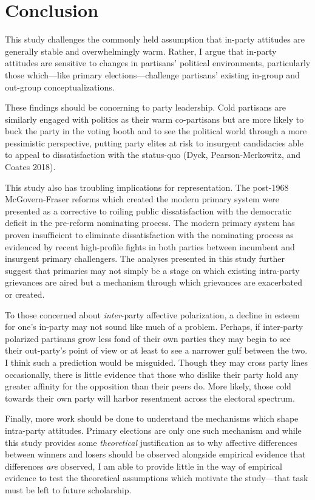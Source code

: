 \documentclass[
]{article}
\begin{document}
\hypertarget{conclusion}{%
\section{Conclusion}\label{conclusion}}

This study challenges the commonly held assumption that in-party attitudes are generally stable and overwhelmingly warm. Rather, I argue that in-party attitudes are sensitive to changes in partisans' political environments, particularly those which---like primary elections---challenge partisans' existing in-group and out-group conceptualizations.

These findings should be concerning to party leadership. Cold partisans are similarly engaged with politics as their warm co-partisans but are more likely to buck the party in the voting booth and to see the political world through a more pessimistic perspective, putting party elites at risk to insurgent candidacies able to appeal to dissatisfaction with the status-quo (Dyck, Pearson-Merkowitz, and Coates 2018).

This study also has troubling implications for representation. The post-1968 McGovern-Fraser reforms which created the modern primary system were presented as a corrective to roiling public dissatisfaction with the democratic deficit in the pre-reform nominating process. The modern primary system has proven insufficient to eliminate dissatisfaction with the nominating process as evidenced by recent high-profile fights in both parties between incumbent and insurgent primary challengers. The analyses presented in this study further suggest that primaries may not simply be a stage on which existing intra-party grievances are aired but a mechanism through which grievances are exacerbated or created.

To those concerned about \emph{inter}-party affective polarization, a decline in esteem for one's in-party may not sound like much of a problem. Perhaps, if inter-party polarized partisans grow less fond of their own parties they may begin to see their out-party's point of view or at least to see a narrower gulf between the two. I think such a prediction would be misguided. Though they may cross party lines occasionally, there is little evidence that those who dislike their party hold any greater affinity for the opposition than their peers do. More likely, those cold towards their own party will harbor resentment across the electoral spectrum.

Finally, more work should be done to understand the mechanisms which shape intra-party attitudes. Primary elections are only one such mechanism and while this study provides some \emph{theoretical} justification as to why affective differences between winners and losers should be observed alongside empirical evidence that differences \emph{are} observed, I am able to provide little in the way of empirical evidence to test the theoretical assumptions which motivate the study---that task must be left to future scholarship.
\end{document}
